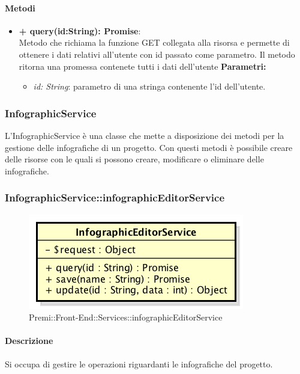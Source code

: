 		\paragraph{Metodi}
		\begin{itemize}
			\item \textbf{+ query(id:String): Promise}:\\
			Metodo che richiama la funzione GET collegata alla risorsa e permette di ottenere i dati relativi all'utente con id passato come parametro. Il metodo ritorna una promessa contenete tutti i dati dell'utente
			\textbf{Parametri:}\\
			\begin{itemize}
				\item \textit{id: String}: parametro di una stringa contenente l'id dell'utente.
			\end{itemize}
		\end{itemize}
\newpage


\subsubsection{InfographicService}
L'InfographicService è una classe che mette a disposizione dei metodi per la gestione delle infografiche di un progetto. Con questi metodi è possibile creare delle risorse con le quali si possono creare, modificare o eliminare delle infografiche.

		
		\subsubsection{InfographicService::infographicEditorService}
		\begin{figure}[h]
			\centering
				\includegraphics[width=0.4\linewidth]{img/premi_front_end_services_infographiceditorservice}
			\caption[Premi::Front-End::Services::InfographicEditorService]{Premi::Front-End::Services::infographicEditorService}
		\end{figure}
		
		\paragraph{Descrizione}
		Si occupa di gestire le operazioni riguardanti le infografiche del progetto.
		
